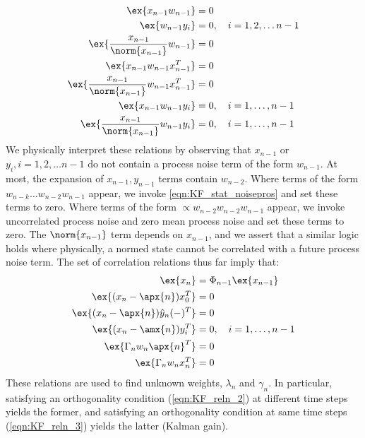 \begin{align}
\ex{x_{n-1}w_{n-1}} & = 0 \label{eqn:KF_reln_4}\\
\ex{w_{n-1} y_i} &= 0, \quad i = 1,2,\dots n-1 \label{eqn:KF_reln_5}\\
\ex{\frac{x_{n-1}}{\norm{x_{n-1}}}w_{n-1}} & = 0 \label{eqn:KF_reln_6}\\
\ex{x_{n-1} w_{n-1} x_{n-1}^T } & = 0 \label{eqn:KF_reln_7}\\
\ex{\frac{x_{n-1}}{\norm{x_{n-1}}} w_{n-1} x_{n-1}^T } & = 0 \label{eqn:KF_reln_8} \\
\ex{x_{n-1} w_{n-1} y_i } & = 0, \quad i = 1,\dots, n-1 \label{eqn:KF_reln_9}\\
\ex{\frac{x_{n-1}}{\norm{x_{n-1}}} w_{n-1} y_i } & = 0, \quad i = 1,\dots, n-1 \label{eqn:KF_reln_10}
\end{align} We physically interpret these relations by observing that $x_{n-1}$ or $y_i, i = 1,2,\dots n-1$ do not contain a process noise term of the form $w_{n-1}$. At most, the expansion of $x_{n-1}, y_{n-1}$ terms contain $w_{n-2}$. Where terms of the form $w_{n-k}\dots w_{n-2}w_{n-1}$ appear, we invoke \ref{eqn:KF_stat_noisepros} and set these terms to zero. Where terms of the form $\propto w_{n-2}w_{n-2}w_{n-1}$ appear, we invoke uncorrelated process noise and zero mean process noise and set these terms to zero. The $\norm{x_{n-1}}$ term depends on $x_{n-1}$, and we assert that a similar logic holds where physically, a normed state cannot be correlated with a future process noise term. The set of correlation relations thus far imply that:
\begin{align}
\ex{x_n} &= \Phi_{n-1}\ex{x_{n-1}} \label{eqn:KF_reln_11}\\
\ex{(x_n - \apx{n})x_0^T} &= 0 \label{eqn:KF_reln_12}\\
\ex{(x_n - \apx{n})\hat{y}_n(-)^T} &=0 \label{eqn:KF_reln_13} \\
\ex{(x_n - \amx{n})y_i^T} &=0, \quad i = 1,\dots, n-1\label{eqn:KF_reln_14}\\
\ex{\Gamma_n w_n \apx{n}^T} &=0 \label{eqn:KF_reln_16}\\
\ex{\Gamma_n w_n x_n^T} &=0 \label{eqn:KF_reln_17} 
\end{align}
These relations are used to find unknown weights, $\lambda_n$ and $\gamma_n$. In particular, satisfying an orthogonality condition (\cref{eqn:KF_reln_2}) at different time steps yields the former, and satisfying an orthogonality condition at same time steps (\cref{eqn:KF_reln_3}) yields the latter (Kalman gain). 

